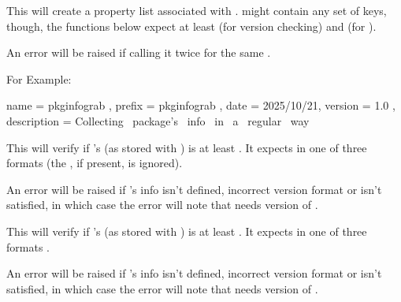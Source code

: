 \documentclass[10pt]{article}
\begin{document}
\begin{codedescribe}{\PkgInfoSet}
\begin{codesyntax}%
\end{codesyntax}
This will create a property list associated with .  might contain any set of keys, though, the functions below expect at least  (for version checking) and  (for \tsobj{\PkgInfoDescription}).
\end{codedescribe}
\begin{tsremark}
  An error will be raised if calling it twice for the same .
\end{tsremark}
For Example:
\begin{codestore}[demoB]
  { 
    name         = {pkginfograb} ,
    prefix       = {pkginfograb} ,
    date         = {2025/10/21},
    version      = {1.0} ,
    description  = {Collecting~ package's~ info~ in~ a~ regular~ way}
  }
\end{codestore}


\begin{codedescribe}{\PkgInfoReqVersion}
\begin{codesyntax}%
\end{codesyntax}
This will verify if 's  (as stored with \tsobj{\PkgInfoSet}) is at least . It expects  in one of three formats  (the \tsobj[key]{[v]}, if present, is ignored).
\end{codedescribe}
\begin{tsremark}
  An error will be raised if 's info isn't defined, incorrect version format or  isn't satisfied, in which case the error will note that  needs version  of .
\end{tsremark}


\begin{codedescribe}{\PkgInfoReqDate}
\begin{codesyntax}%
\end{codesyntax}
This will verify if 's  (as stored with \tsobj{\PkgInfoSet}) is at least . It expects  in one of three formats  .
\end{codedescribe}
\begin{tsremark}
  An error will be raised if 's info isn't defined, incorrect version format or  isn't satisfied, in which case the error will note that  needs version  of .
\end{tsremark}
\end{document}

